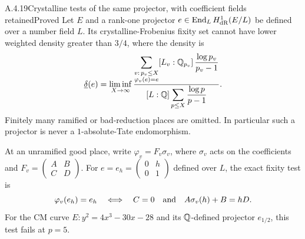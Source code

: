 \begin{result}{A.4.19}{Crystalline tests of the same projector, with coefficient fields retained}{Proved}
Let $E$ and a rank-one projector $e\in\operatorname{End}_L H^1_{\mathrm{dR}}(E/L)$ be defined over a number field $L$. Its crystalline-Frobenius fixity set cannot have lower weighted density greater than $3/4$, where the density is
\[
 \underline\delta(e)=\liminf_{X\to\infty}
 \frac{\displaystyle\sum_{\substack{v:\,p_v\le X\\\varphi_v(e)=e}}
 [L_v:\mathbb Q_{p_v}]\,\frac{\log p_v}{p_v-1}}
 {[L:\mathbb Q]\displaystyle\sum_{p\le X}\frac{\log p}{p-1}}.
\]
Finitely many ramified or bad-reduction places are omitted. In particular such a projector is never a $1$-absolute-Tate endomorphism.

At an unramified good place, write $\varphi_v=F_v\sigma_v$, where $\sigma_v$ acts on the coefficients and $F_v=\left(\begin{smallmatrix}A&B\\C&D\end{smallmatrix}\right)$. For $e=e_h=\left(\begin{smallmatrix}0&h\\0&1\end{smallmatrix}\right)$ defined over $L$, the exact fixity test is
\[
 \varphi_v(e_h)=e_h
 \quad\Longleftrightarrow\quad
 C=0\quad\hbox{and}\quad A\sigma_v(h)+B=hD.
\]
For the CM curve $E:y^2=4x^3-30x-28$ and its $\mathbb Q$-defined projector $e_{1/2}$, this test fails at $p=5$.
\end{result}
